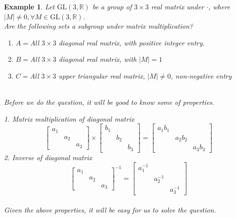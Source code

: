 \documentclass{article}
\theoremstyle{MyNonumberplain}
\theoremstyle{break}
\theoremstyle{break}
\newtheorem{example}{Example}[section]
\theoremstyle{break}
\theoremstyle{definition}
\theoremstyle{break}
\begin{document}
\begin{expbox}
    \begin{example}
        Let $\text{GL} (3, \mathbb{R})$ be a group of $3 \times 3$ real matrix under
        $\cdot$, where $| M | \neq 0, \forall M \in \text{GL} (3, \mathbb{R})$.\\

        Are the following sets a subgroup under matrix multiplication?\\
        \begin{enumerate}
        \item $A =$All $3 \times 3$ diagonal real matrix, with positive integer
        entry.\\
        
        \item $B =$All $3 \times 3$ diagonal real matrix, with $| M | = 1$\\
        
        \item $C =$All $3 \times 3$ upper triangular real matrix, $| M | \neq 0$,
        non-negative entry\\\\
        \end{enumerate}

        Before we do the question, it will be good to know some of properties.

        1. Matrix multiplication of diagonal matrix
        \[ \left[\begin{array}{ccc}
            a_1 &  & \\
            & a_2 & \\
            &  & a_3
        \end{array}\right] \times \left[\begin{array}{ccc}
            b_1 &  & \\
            & b_2 & \\
            &  & b_3
        \end{array}\right] = \left[\begin{array}{ccc}
            a_1 b_1 &  & \\
            & a_2 b_2 & \\
            &  & a_3 b_3
        \end{array}\right] \]
        2. Inverse of diagonal matrix
        \[ \left[\begin{array}{ccc}
            a_1 &  & \\
            & a_2 & \\
            &  & a_3
        \end{array}\right]^{- 1} = \left[\begin{array}{ccc}
            a^{- 1}_1 &  & \\
            & a^{- 1}_2 & \\
            &  & a^{- 1}_3
        \end{array}\right] \]\\
        Given the above properties, it will be easy for us to solve the question.\\


\end{example}
\end{expbox}
\end{document}
